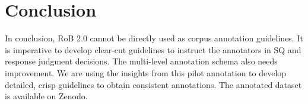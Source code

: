 \documentclass{IOS-Book-Article}
\begin{document}
\section{Conclusion}
\label{sec:conclusion}
%
In conclusion, RoB 2.0 cannot be directly used as corpus annotation guidelines.
It is imperative to develop clear-cut guidelines to instruct the annotators in SQ and response judgment decisions.
The multi-level annotation schema also needs improvement.
We are using the insights from this pilot annotation to develop detailed, crisp guidelines to obtain consistent annotations. 
The annotated dataset is available on Zenodo.
%
%
%
 
%
%

%
\end{document}
